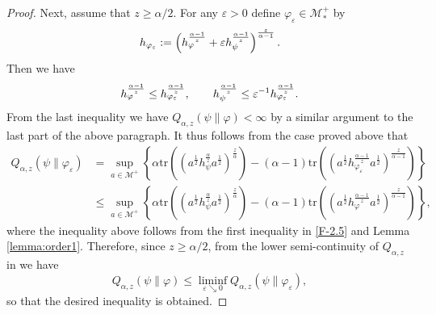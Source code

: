 \documentclass[12pt]{article}
\theoremstyle{definition}
\theoremstyle{remark}
\numberwithin{equation}{section}
\def\Me{\mathcal M}
\def\Tr{\mathrm{tr}}
\def\eps{\varepsilon}
\begin{document}
\begin{proof}
Next, assume that $z\ge\alpha/2$. For any $\eps>0$ define $\varphi_\eps\in\Me_*^+$ by
\[
h_{\varphi_\eps}:=\left(
h_\varphi^{\alpha-1\over z}+\eps h_\psi^{\alpha-1\over z}\right)^{z\over\alpha-1}.
\]
Then we have
\begin{align}\label{F-2.5}
h_\varphi^{\alpha-1\over z}\le h_{\varphi_\eps}^{\alpha-1\over z},\qquad
h_\psi^{\alpha-1\over z}\le\eps^{-1}h_{\varphi_\eps}^{\alpha-1\over z}.
\end{align}
From the last inequality we have $Q_{\alpha,z}(\psi\|\varphi)<\infty$ by a similar argument to
the last part of the above paragraph. It thus follows from the case proved above that
\begin{align*}
Q_{\alpha,z}(\psi\|\varphi_\varepsilon)&=\sup_{a\in \Me^+} \left\{\alpha
\Tr\left((a^{\frac12}h_\psi^{\frac{\alpha}{z}}a^{\frac12})^{\frac{z}{\alpha}}\right)
-(\alpha-1)\Tr\left((a^{\frac12}h_{\varphi_\eps}^{\frac{\alpha-1}{z}}
a^{\frac12})^{\frac{z}{\alpha-1}}\right)\right\}\\
&\le\sup_{a\in \Me^+} \left\{\alpha
\Tr\left((a^{\frac12}h_\psi^{\frac{\alpha}{z}}a^{\frac12})^{\frac{z}{\alpha}}\right)-(\alpha-1)
\Tr\left((a^{\frac12}h_\varphi^{\frac{\alpha-1}{z}}a^{\frac12})^{\frac{z}{\alpha-1}}\right)
\right\},
\end{align*}
where the inequality above follows from the first inequality in \eqref{F-2.5} and Lemma \ref{lemma:order1}.
Therefore, since $z\ge\alpha/2$, from the lower semi-continuity of $Q_{\alpha,z}$ in
\cite[Theorem 2(iv)]{kato2023onrenyi} we have
\[
Q_{\alpha,z}(\psi\|\varphi)\le \liminf_{\varepsilon\searrow 0}
Q_{\alpha,z}(\psi\|\varphi_\varepsilon),
\]
so that the desired inequality is obtained.

\end{proof}


\end{document}
